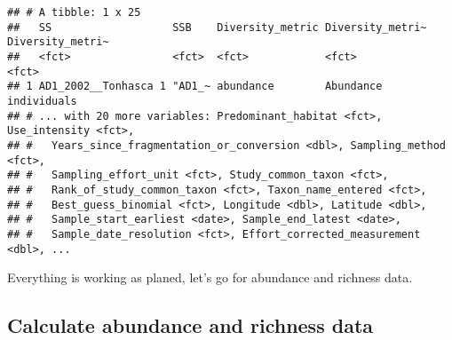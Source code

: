 \documentclass[
]{article}
\begin{document}
\begin{verbatim}
## # A tibble: 1 x 25
##   SS                   SSB    Diversity_metric Diversity_metri~ Diversity_metri~
##   <fct>                <fct>  <fct>            <fct>            <fct>           
## 1 AD1_2002__Tonhasca 1 "AD1_~ abundance        Abundance        individuals     
## # ... with 20 more variables: Predominant_habitat <fct>, Use_intensity <fct>,
## #   Years_since_fragmentation_or_conversion <dbl>, Sampling_method <fct>,
## #   Sampling_effort_unit <fct>, Study_common_taxon <fct>,
## #   Rank_of_study_common_taxon <fct>, Taxon_name_entered <fct>,
## #   Best_guess_binomial <fct>, Longitude <dbl>, Latitude <dbl>,
## #   Sample_start_earliest <date>, Sample_end_latest <date>,
## #   Sample_date_resolution <fct>, Effort_corrected_measurement <dbl>, ...
\end{verbatim}

Everything is working as planed, let's go for abundance and richness
data.

\hypertarget{calculate-abundance-and-richness-data}{%
\subsection{Calculate abundance and richness
data}\label{calculate-abundance-and-richness-data}}
\end{document}
